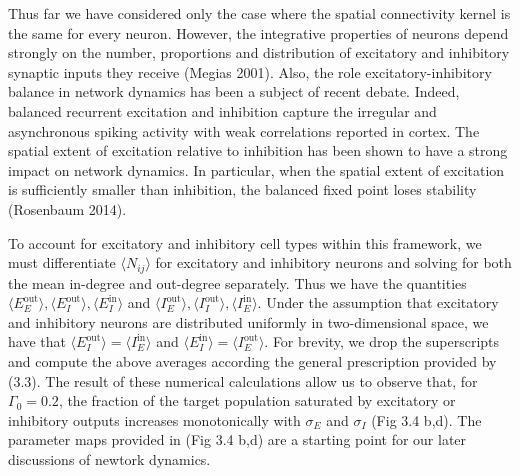 \documentclass{ucetd}
\begin{document}
Thus far we have considered only the case where the spatial connectivity kernel is the same for every neuron. However, the integrative properties of neurons depend strongly on the number, proportions and distribution of excitatory and inhibitory synaptic inputs they receive (Megias 2001). Also, the role excitatory-inhibitory balance in network dynamics has been a subject of recent debate. Indeed, balanced recurrent excitation and inhibition capture the irregular and asynchronous spiking activity with weak correlations reported in cortex. The spatial extent of excitation relative to inhibition has been shown to have a strong impact on network dynamics. In particular, when the spatial extent of excitation is sufficiently smaller than inhibition, the balanced fixed point loses stability (Rosenbaum 2014). 

To account for excitatory and inhibitory cell types within this framework, we must differentiate $\langle N_{ij}\rangle$ for excitatory and inhibitory neurons and solving for both the mean in-degree and out-degree separately. Thus we have the quantities $\langle E_{E}^{\mathrm{out}} \rangle,\langle E_{I}^{\mathrm{out}} \rangle,\langle E_{I}^{\mathrm{in}} \rangle$ and $\langle I_{E}^{\mathrm{out}} \rangle,\langle I_{I}^{\mathrm{out}} \rangle,\langle I_{E}^{\mathrm{in}} \rangle$. Under the assumption that excitatory and inhibitory neurons are distributed uniformly  in two-dimensional space, we have that $\langle E_{I}^{\mathrm{out}} \rangle = \langle I_{E}^{\mathrm{in}} \rangle$ and $\langle E_{I}^{\mathrm{in}} \rangle = \langle I_{E}^{\mathrm{out}}\rangle$. For brevity, we drop the superscripts and compute the above averages according the general prescription provided by (3.3). The result of these numerical calculations allow us to observe that, for $\Gamma_{0} = 0.2$, the fraction of the target population saturated by excitatory or inhibitory outputs increases monotonically with $\sigma_{E}$ and $\sigma_{I}$  (Fig 3.4 b,d). The parameter maps provided in (Fig 3.4 b,d) are a starting point for our later discussions of newtork dynamics. 
\end{document}
